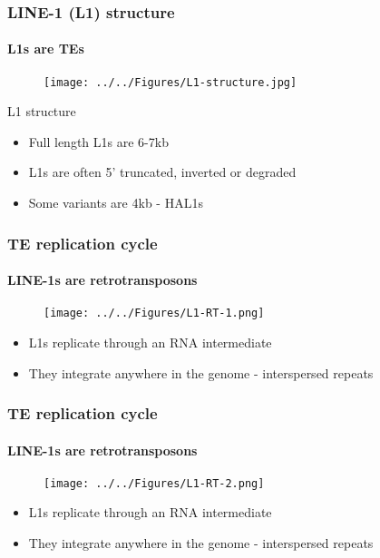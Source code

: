 \documentclass{beamer}
\begin{document}
		\begin{frame} %
			
			\frametitle{LINE-1 (L1) structure}
			\framesubtitle{L1s are TEs}
			
			\begin{figure}
				\texttt{[image: ../../Figures/L1-structure.jpg]}
			\end{figure}
			
			\begin{block}{L1 structure}
				\begin{itemize}
					\item Full length L1s are 6-7kb 
					\item L1s are often 5' truncated, inverted or degraded
					\item Some variants are 4kb - HAL1s
				\end{itemize}
				
			\end{block}
		\end{frame}
		
		\begin{frame} %
			
			\frametitle{TE replication cycle}
			\framesubtitle{LINE-1s are retrotransposons}

			\begin{figure}
				\texttt{[image: ../../Figures/L1-RT-1.png]}
			\end{figure}
			\begin{itemize}
				\item L1s replicate through an RNA intermediate
				\item They integrate anywhere in the genome - interspersed repeats
			\end{itemize}
			
		

		\end{frame}
	
		\begin{frame} %
			
			\frametitle{TE replication cycle}
			\framesubtitle{LINE-1s are retrotransposons}
			
			\begin{figure}
				\texttt{[image: ../../Figures/L1-RT-2.png]}
			\end{figure}
			\begin{itemize}
				\item L1s replicate through an RNA intermediate
				\item They integrate anywhere in the genome - interspersed repeats
			\end{itemize}
			
		\end{frame}
		
\end{document}
